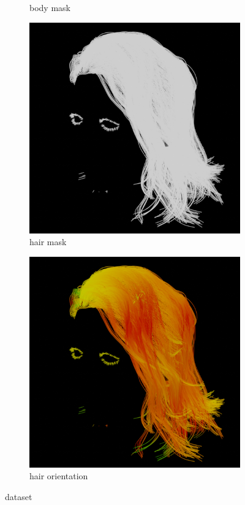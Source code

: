 \documentclass[12pt]{article}
\begin{document}
\begin{figure}[h]
\begin{subfigure}{0.24\textwidth}
		\caption{body mask}
	\end{subfigure}
	\hfill
	\begin{subfigure}{0.24\textwidth}
		\centering
		\includegraphics[width=\textwidth]{./images/dataset/0009_hairmask.png}
		\caption{hair mask}
	\end{subfigure}
	\hfill
	\begin{subfigure}{0.24\textwidth}
        \centering
        \includegraphics[width=\textwidth]{./images/dataset/0009_hairdir.png}
        \caption{hair orientation}
	\end{subfigure}

	\caption{dataset}
	\label{fig:dataset}
\end{figure}
\end{document}
